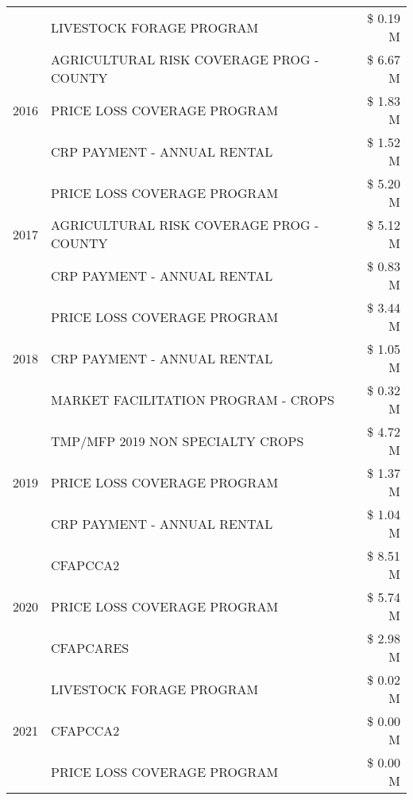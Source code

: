 \begin{tabular}{llr}
 & LIVESTOCK FORAGE PROGRAM & \$ 0.19 M \\
\cline{1-3}
\multirow[t]{3}{*}{2016} & AGRICULTURAL RISK COVERAGE PROG - COUNTY      & \$ 6.67 M \\
 & PRICE LOSS COVERAGE PROGRAM                   & \$ 1.83 M \\
 & CRP PAYMENT - ANNUAL RENTAL                   & \$ 1.52 M \\
\cline{1-3}
\multirow[t]{3}{*}{2017} & PRICE LOSS COVERAGE PROGRAM & \$ 5.20 M \\
 & AGRICULTURAL RISK COVERAGE PROG - COUNTY & \$ 5.12 M \\
 & CRP PAYMENT - ANNUAL RENTAL & \$ 0.83 M \\
\cline{1-3}
\multirow[t]{3}{*}{2018} & PRICE LOSS COVERAGE PROGRAM & \$ 3.44 M \\
 & CRP PAYMENT - ANNUAL RENTAL & \$ 1.05 M \\
 & MARKET FACILITATION PROGRAM - CROPS & \$ 0.32 M \\
\cline{1-3}
\multirow[t]{3}{*}{2019} & TMP/MFP 2019 NON SPECIALTY CROPS & \$ 4.72 M \\
 & PRICE LOSS COVERAGE PROGRAM & \$ 1.37 M \\
 & CRP PAYMENT - ANNUAL RENTAL & \$ 1.04 M \\
\cline{1-3}
\multirow[t]{3}{*}{2020} & CFAPCCA2 & \$ 8.51 M \\
 & PRICE LOSS COVERAGE PROGRAM & \$ 5.74 M \\
 & CFAPCARES & \$ 2.98 M \\
\cline{1-3}
\multirow[t]{3}{*}{2021} & LIVESTOCK FORAGE PROGRAM & \$ 0.02 M \\
 & CFAPCCA2 & \$ 0.00 M \\
 & PRICE LOSS COVERAGE PROGRAM & \$ 0.00 M \\
\cline{1-3}
\bottomrule
\end{tabular}
